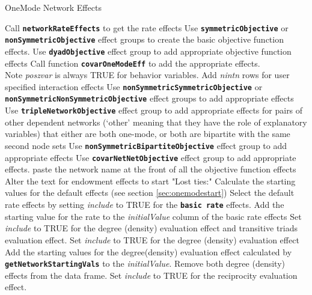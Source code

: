 \documentclass[12pt,a4paper]{article}
\makeatletter
\renewcommand{\=}{\,=\,}
\newcommand{\+}{\,+\,}
\newcommand{\nnm}[1]{\textsf{\textit{#1}}}
\renewcommand{\subsection}{\@startsection{subsection}{2}
                {0pt}{0.7\baselineskip}{0.3\baselineskip}
                {\sffamily} }
\newcommand{\sfn}[1]{\textbf{\texttt{#1}}}
\makeatother
\begin{document}
\subsection{OneMode Network Effects}
\begin{algorithmic}
  \STATE Call \sfn{networkRateEffects} to get the rate effects
  \STATE Use \sfn{symmetricObjective} or \sfn{nonSymmetricObjective} effect
  groups to create the basic objective function effects.
  \STATE Use \sfn{dyadObjective} effect group to add appropriate objective
  function effects
  \ENDFOR
  \STATE Call function \sfn{covarOneModeEff} to add the appropriate effects.\\
  Note \nnm{poszvar} is always TRUE for behavior variables.
  \ENDFOR
  \STATE Add \nnm{nintn} rows for user specified interaction effects
  \ENDIF
  \STATE Use \sfn{nonSymmetricSymmetricObjective} or
  \sfn{nonSymmetricNonSymmetricObjective} effect groups to add appropriate
    effects
  \STATE Use \sfn{tripleNetworkObjective} effect group to add appropriate
    effects for pairs of other dependent networks
    (`other' meaning that they have the role of explanatory variables)
    that either are both one-mode,
    or both are bipartite with the same second node sets
  \STATE Use \sfn{nonSymmetricBipartiteObjective} effect group to add
  appropriate effects
  \ENDIF
  \STATE Use \sfn{covarNetNetObjective} effect group to add appropriate effects.
  \ENDFOR
  \ENDFOR
  \STATE paste the network name at the front of all the objective function
  effects
  \ENDIF
  \STATE Alter the text for endowment effects to start "Lost ties:"
  \STATE Calculate the starting values for the default effects
  (see section \ref{sec:onemodestart})
  \STATE Select the default rate effects by setting \nnm{include} to TRUE for
  the \sfn{basic rate} effects.
  \STATE Add the starting value for the rate to the \nnm{initialValue} column
  of the basic rate effects
  \STATE Set \nnm{include} to TRUE for the degree (density) evaluation effect
  and transitive triads evaluation effect.
  \ELSE
  \STATE  Set \nnm{include} to TRUE for the degree (density) evaluation effect
  \STATE Add the starting values for the degree(density) evaluation effect
  calculated by \sfn{getNetworkStartingVals} to the \nnm{initialValue}.
  \ELSE
  \STATE Remove both degree (density) effects from the data frame.
  \ENDIF
  \STATE Set \nnm{include} to TRUE for the reciprocity evaluation effect.
  \ENDIF
\end{algorithmic}
\end{document}
